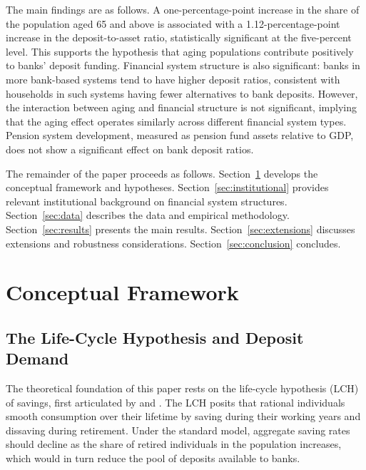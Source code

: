 \documentclass[12pt,a4paper]{article}
\begin{document}
The main findings are as follows. A one-percentage-point increase in the share of the population aged 65 and above is associated with a 1.12-percentage-point increase in the deposit-to-asset ratio, statistically significant at the five-percent level. This supports the hypothesis that aging populations contribute positively to banks' deposit funding. Financial system structure is also significant: banks in more bank-based systems tend to have higher deposit ratios, consistent with households in such systems having fewer alternatives to bank deposits. However, the interaction between aging and financial structure is not significant, implying that the aging effect operates similarly across different financial system types. Pension system development, measured as pension fund assets relative to GDP, does not show a significant effect on bank deposit ratios.

The remainder of the paper proceeds as follows. Section~\ref{sec:framework} develops the conceptual framework and hypotheses. Section~\ref{sec:institutional} provides relevant institutional background on financial system structures. Section~\ref{sec:data} describes the data and empirical methodology. Section~\ref{sec:results} presents the main results. Section~\ref{sec:extensions} discusses extensions and robustness considerations. Section~\ref{sec:conclusion} concludes.


\section{Conceptual Framework}
\label{sec:framework}

\subsection{The Life-Cycle Hypothesis and Deposit Demand}

The theoretical foundation of this paper rests on the life-cycle hypothesis (LCH) of savings, first articulated by \citet{Modigliani1954} and \citet{Ando1963}. The LCH posits that rational individuals smooth consumption over their lifetime by saving during their working years and dissaving during retirement. Under the standard model, aggregate saving rates should decline as the share of retired individuals in the population increases, which would in turn reduce the pool of deposits available to banks.
\end{document}
